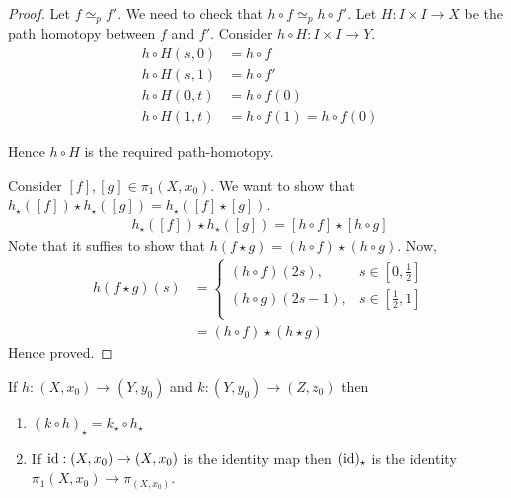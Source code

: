 \documentclass[12pt]{amsart}
\begin{document}
\begin{proof}
    Let $f \simeq_p f'$. We need to check that $h \circ f \simeq_p h \circ f'$. 
    Let $H: I \times I \to X$ be the path homotopy between $f$ and $f'$. Consider $h \circ H: I\times I \to Y$. 
    \begin{align*}
        h\circ H(s, 0) &= h \circ f \\ 
        h\circ H(s, 1) &= h \circ f' \\ 
        h\circ H(0,t) &= h \circ f(0) \\ 
        h\circ H(1,t) &= h \circ f(1) = h \circ f(0) 
    \end{align*}

    Hence $h \circ H$ is the required path-homotopy. 

    Consider $[f], [g] \in \pi_1(X, x_0)$. We want to show that 
    $h_\star([f]) \star h_\star([g]) = h_\star([f] \star [g])$. 
    \begin{align*}
        h_\star([f])\star h_\star([g])  = [h \circ f] \star [h \circ g] 
    \end{align*}
    Note that it suffies to show that $h(f \star g) = (h \circ f) \star (h \circ g)$. Now, 
    \begin{align*}
        h(f \star g)(s) &= \begin{cases} 
            (h \circ f)(2s), & s\in \left[0,\frac{1}{2}\right]\\
            (h \circ g)(2s-1), & s\in \left[\frac{1}{2}, 1\right]\\
        \end{cases} \\
            &=( h\circ f) \star (h\star g) 
    \end{align*}
    Hence proved. 
\end{proof}

\begin{theorem}
    If $h: (X, x_0) \to (Y, y_0)$ and $k: (Y, y_0) \to (Z, z_0)$ then 
    \begin{enumerate}
        \item [(a)] $(k \circ h)_\star = k_\star \circ h_\star$
        \item [(b)] If $\operatorname{id}: (X, x_0) \to (X, x_0)$ is the identity map then $(\operatorname{id})_\star$ is the identity $\pi_1(X, x_0) \to \pi_(X, x_0)$. 
    \end{enumerate}
\end{theorem}
\end{document}
